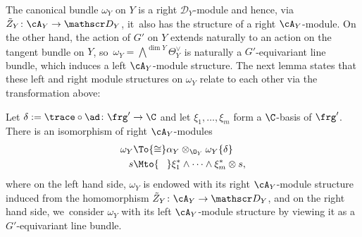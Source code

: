 The canonical bundle $\omega_Y$ on $Y$ is a right $\mathscr{D}_Y$\nobreakdash-mod\-ule and hence, via $\tilde Z_Y \colon \cA_Y \to \mathscr D_Y$, it~also has the structure of a right $\cA_Y$\nobreakdash-mod\-ule. On the other hand, the action of $G'$ on $Y$ extends naturally to an action on the tangent bundle on $Y$, so~$\omega_Y = \bigwedge^{\dim Y} \Theta_Y^\vee$ is naturally a $G'$-equivariant line bundle, which induces a left $\cA_Y$\nobreakdash-mod\-ule structure. The next lemma states that these left and right module structures on $\omega_Y$ relate to each other via the transformation above:

\begin{lem} \label{lem:rightAModuleStructuresOnOmega}
Let $\delta := \trace \circ \ad \colon \frg' \to \C$ and let $\xi_1,\dots,\xi_m$ form a $\C$-basis of $\frg'$. There is an isomorphism of right $\cA_Y$\nobreakdash-mod\-ules
\begin{align*}
\omega_Y &\To{\cong} \alpha_Y \otimes_{\O_Y} \omega_Y\{\delta\} \\
s &\Mto{\hphantom{\cong}} \xi_1^* \wedge \dots \wedge \xi_m^* \otimes s,
\end{align*}
where on the left hand side, $\omega_Y$ is endowed with its right $\cA_Y$\nobreakdash-mod\-ule structure induced from the homomorphism $\tilde Z_Y \colon \cA_Y \to \mathscr D_Y$, and on the right hand side, we~consider $\omega_Y$ with its left $\cA_Y$\nobreakdash-mod\-ule structure by viewing it as a $G'$-equivariant line bundle.
\end{lem}

